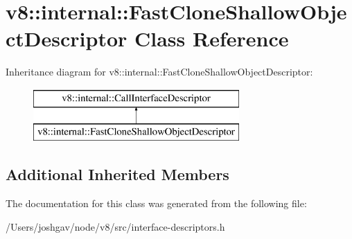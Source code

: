 \hypertarget{classv8_1_1internal_1_1_fast_clone_shallow_object_descriptor}{}\section{v8\+:\+:internal\+:\+:Fast\+Clone\+Shallow\+Object\+Descriptor Class Reference}
\label{classv8_1_1internal_1_1_fast_clone_shallow_object_descriptor}
Inheritance diagram for v8\+:\+:internal\+:\+:Fast\+Clone\+Shallow\+Object\+Descriptor\+:\begin{figure}[H]
\begin{center}
\leavevmode
\includegraphics[height=2.000000cm]{classv8_1_1internal_1_1_fast_clone_shallow_object_descriptor}
\end{center}
\end{figure}
\subsection*{Additional Inherited Members}


The documentation for this class was generated from the following file\+:\begin{DoxyCompactItemize}
\item 
/\+Users/joshgav/node/v8/src/interface-\/descriptors.\+h\end{DoxyCompactItemize}
